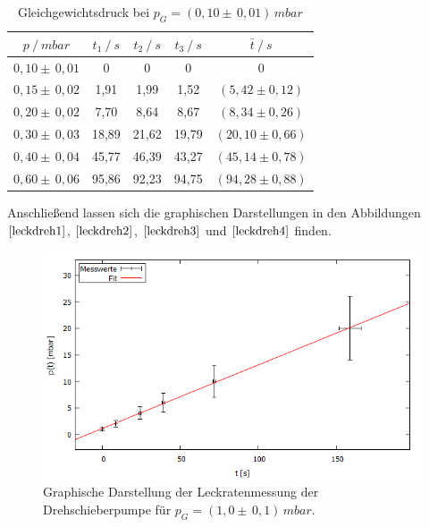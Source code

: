\begin{table}[H]
\centering
\begin{tabular}{c|c|c|c|c}
	{$p \:/\: \si{mbar}$} & {$t_1 \:/\: \si{s} $} & {$t_2 \:/\: \si{s} $} & {$t_3 \:/\: \si{s} $} & {$\bar{t} \:/\: \si{s}$}\\
\midrule
$0,10 \pm \, 0,01$ &0 &0 &0 &0\\
$0,15 \pm \, 0,02$ &   1,91 &  1,99 &  1,52 & $(5,42 \pm 0,12)$\\
$0,20 \pm \, 0,02$ &   7,70  &  8,64 &  8,67 & $(8,34 \pm 0,26) $\\
$0,30 \pm \, 0,03$ &   18,89 &  21,62 &  19,79 & $(20,10 \pm 0,66) $\\
$0,40 \pm \, 0,04$ &   45,77 &  46,39 & 43,27 & $(45,14 \pm 0,78) $\\
$0,60 \pm \, 0,06$ &   95,86 &  92,23 &  94,75 & $(94,28 \pm 0,88) $\\
\end{tabular}
\caption{Gleichgewichtsdruck bei $p_G=(0,10 \pm \, 0,01) \, \si{mbar}$}
\label{tab:leck_Dreh4}
\end{table}
Anschließend lassen sich die graphischen Darstellungen in den Abbildungen $\ref{leckdreh1}$, $\ref{leckdreh2}$, $\ref{leckdreh3}$ und $\ref{leckdreh4}$ finden.
\begin{figure}[H]
  \centering
  \includegraphics[width=14cm]{bilder/leckdrehfit1.png}
	\caption{Graphische Darstellung der Leckratenmessung der Drehschieberpumpe für $p_G=(1,0 \pm \, 0,1)  \, \si{mbar}$.}
  \label{leckdreh1}
\end{figure}
